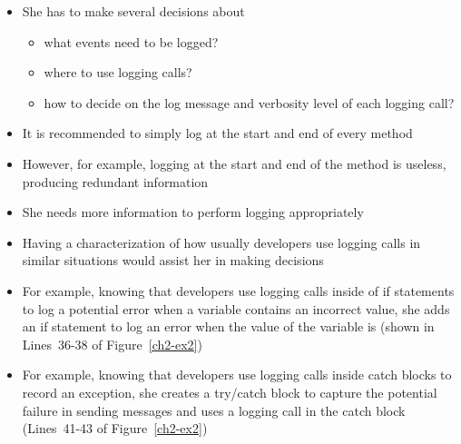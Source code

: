 \begin{itemize} [leftmargin=.01in]
\item She has to make several decisions about
\begin{itemize} [leftmargin=.3in]
\item what events need to be logged?
\item where to use logging calls?
\item how to decide on the log message and verbosity level of each logging call?
\end{itemize}
\item It is recommended to simply log at the start and end of every method
\item However, for example, logging at the start and end of the method  is useless, producing redundant information
\item She needs more information to perform logging appropriately
\item Having a characterization  of how usually developers use logging calls in similar situations would assist her in making decisions
\item For example, knowing that developers use logging calls inside of if statements to log a potential error when a variable contains an incorrect value, she adds an if statement to log an error when the value of the variable  is  (shown in Lines~36-38 of Figure~\ref{ch2-ex2})
\item For example, knowing that developers use logging calls inside catch blocks to record an exception, she creates a try/catch block to capture the potential failure in sending messages and uses a logging call in the catch block (Lines~41-43 of Figure~\ref{ch2-ex2})


\end{itemize}
